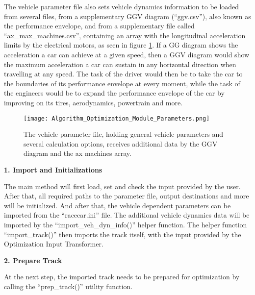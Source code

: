 The vehicle parameter file also sets vehicle dynamics information to be loaded from several files, from a supplementary GGV diagram (``ggv.csv''), also known as the performance envelope, and from a supplementary file called ``ax\_max\_machines.csv'', containing an array with the longitudinal acceleration limits by the electrical motors, as seen in figure \ref{fig:Optimization Algorithm Module Parameters}. If a GG diagram shows the acceleration a car can achieve at a given speed, then a GGV diagram would show the maximum acceleration a car can sustain in any horizontal direction when travelling at any speed. The task of the driver would then be to take the car to the boundaries of its performance envelope at every moment, while the task of the engineers would be to expand the performance envelope of the car by improving on its tires, aerodynamics, powertrain and more.
\begin{figure}[H]
    \centering
    \texttt{[image: Algorithm\_Optimization\_Module\_Parameters.png]}
    \caption{The vehicle parameter file, holding general vehicle parameters and several calculation options, receives additional data by the GGV diagram and the ax machines array.}
    \label{fig:Optimization Algorithm Module Parameters}
\end{figure}

\textbf{1. Import and Initializations}

The main method will first load, set and check the input provided by the user. After that, all required paths to the parameter file, output destinations and more will be initialized. And after that, the vehicle dependent parameters can be imported from the ``racecar.ini'' file. The additional vehicle dynamics data will be imported by the ``import\_veh\_dyn\_info()'' helper function. The helper function ``import\_track()'' then imports the track itself, with the input provided by the Optimization Input Transformer.

\textbf{2. Prepare Track}

At the next step, the imported track needs to be prepared for optimization by calling the ``prep\_track()'' utility function.

